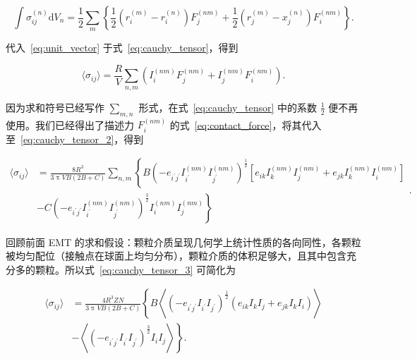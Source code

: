 \begin{equation}
  \int\sigma_{ij}^{(n)}\mathrm{d}V_{n} = \frac{1}{2}\sum_{m}\left\{\frac{1}{2}\left(r_{i}^{(m)} - r_{i}^{(n)}\right)F_{j}^{(nm)} + \frac{1}{2}\left(r_{j}^{(m)} - x_{j}^{(n)}\right)F_{i}^{(nm)}\right\}\label{eq:cauchy_tensor}.
\end{equation}

代入~\eqref{eq:unit_vector} 于式~\eqref{eq:cauchy_tensor}，得到

\begin{equation}
  \langle\sigma_{ij}\rangle = \frac{R}{V}\sum_{n,m}\left(I_{i}^{(nm)}F_{j}^{(nm)} + I_{j}^{(nm)}F_{i}^{(nm)}\right)\label{eq:cauchy_tensor_2}.
\end{equation}

因为求和符号已经写作 $\sum_{m,n}$ 形式，在式~\eqref{eq:cauchy_tensor} 中的系数 $\frac{1}{2}$ 便不再使用。我们已经得出了描述力 $F_{i}^{(nm)}$ 的式~\eqref{eq:contact_force}，将其代入至~\eqref{eq:cauchy_tensor_2}，得到

\begin{equation}
  \begin{aligned}
    \langle\sigma_{ij}\rangle &= \frac{8R^{3}}{3\uppi VB(2B+C)}\sum_{n,m}\left\{B\left(-e_{i^{\prime}j^{\prime}}I_{i^{\prime}}^{(nm)}I_{j^{\prime}}^{(nm)}\right)^{\frac{1}{2}}\left[e_{ik}I_{k}^{(nm)}I_{j}^{(nm)} + e_{jk}I_{k}^{(nm)}I_{i}^{(nm)}\right]\right.\\
    &-\left. C\left(-e_{i^{\prime}j^{\prime}}I_{i^{\prime}}^{(nm)}I_{j^{\prime}}^{(nm)}\right)^{\frac{3}{2}}I_{i}^{(nm)}I_{j}^{(nm)}\right\}
  \end{aligned}\label{eq:cauchy_tensor_3}.
\end{equation}

回顾前面 EMT 的求和假设：颗粒介质呈现几何学上统计性质的各向同性，各颗粒被均匀配位（接触点在球面上均匀分布），颗粒介质的体积足够大，且其中包含充分多的颗粒。所以式~\eqref{eq:cauchy_tensor_3} 可简化为

\begin{equation}
  \begin{aligned}
  \langle\sigma_{ij}\rangle &= \frac{4R^{3}ZN}{3\uppi VB(2B+C)}\left\{B\left\langle(-e_{i^{\prime}j^{\prime}}I_{i^{\prime}}I_{j^{\prime}})^{\frac{1}{2}}(e_{ik}I_{k}I_{j} + e_{jk}I_{k}I_{i})\right\rangle\right.\\
  &-\left.\left\langle(-e_{i^{\prime}j^{\prime}}I_{i^{\prime}}I_{j^{\prime}})^{\frac{3}{2}}I_{i}I_{j}\right\rangle\right\}.
  \end{aligned}\label{eq:cauchy_tensor_4}
\end{equation}

